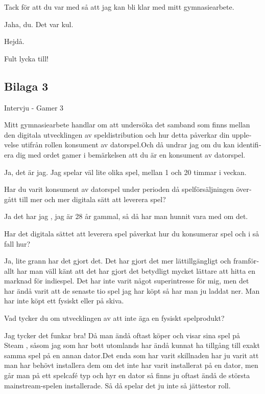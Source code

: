 \documentclass[11p]{article}
\begin{document}
\begin{otherlanguage}{swedish}
    \setlength{\leftskip}{0cm}
    Tack för att du var med så att jag kan bli klar med mitt gymnasiearbete.

    \setlength{\leftskip}{1cm}
    Jaha, du. Det var kul.


    \setlength{\leftskip}{0cm}
    Hejdå.

    \setlength{\leftskip}{1cm}
    Fult lycka till!


    \setlength{\leftskip}{0cm}

    \subsection{Bilaga 3}
    Intervju - Gamer 3

    Mitt gymnasiearbete handlar om att undersöka det samband som finns mellan den digitala utvecklingen av speldistribution och hur detta påverkar din upplevelse utifrån rollen konsument av datorspel.Och då undrar jag om du kan identifiera dig med ordet gamer i bemärkelsen att du är en konsument av datorspel.

    \setlength{\leftskip}{1cm}
    Ja, det är jag. Jag spelar väl lite olika spel, mellan 1 och 20 timmar i veckan.


    \setlength{\leftskip}{0cm}
    Har du varit konsument av datorspel under perioden då spelförsäljningen övergått till mer och mer digitala sätt att leverera spel?

    \setlength{\leftskip}{1cm}
    Ja det har jag , jag är 28 år gammal, så då har man hunnit vara med om det.


    \setlength{\leftskip}{0cm}
    Har det digitala sättet att leverera spel påverkat hur du konsumerar spel och i så fall hur?


    \setlength{\leftskip}{1cm}
    Ja, lite grann har det gjort det. Det har gjort det mer lättillgängligt och framförallt har man väll känt att det har gjort det betydligt mycket lättare att hitta en marknad för indiespel.
    Det har inte varit något superintresse för mig, men det har ändå varit att de senaste tio spel jag har köpt så har man ju laddat ner. Man har inte köpt ett fysiskt eller på skiva.


    \setlength{\leftskip}{0cm}
    Vad tycker du om utvecklingen av att inte äga en fysiskt spelprodukt?


    \setlength{\leftskip}{1cm}
    Jag tycker det funkar bra!
    Då man ändå oftast köper och visar sina spel på Steam , såsom jag som har bott utomlands har ändå kunnat ha tillgång till exakt samma spel på en annan dator.Det enda som har varit skillnaden har ju varit att man har behövt installera dem om det inte har varit installerat på en dator, men går man på ett spelcafé typ och hyr en dator så finns ju oftast ändå de största mainstream-spelen installerade. Så då spelar det ju inte så jättestor roll.


\end{otherlanguage}
\end{document}
